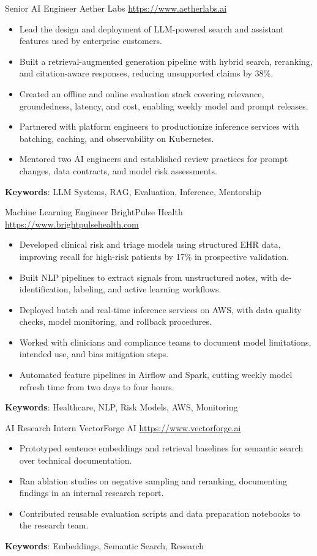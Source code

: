 \documentclass[a4paper, serif, 10pt]{moderncv}
\begin{document}
        {Senior AI Engineer}
        {Aether Labs}
        {\url{https://www.aetherlabs.ai}}
        {}
        {\begin{itemize}
\item Lead the design and deployment of LLM-powered search and assistant features used by enterprise customers.
\item Built a retrieval-augmented generation pipeline with hybrid search, reranking, and citation-aware responses, reducing unsupported claims by 38\%.
\item Created an offline and online evaluation stack covering relevance, groundedness, latency, and cost, enabling weekly model and prompt releases.
\item Partnered with platform engineers to productionize inference services with batching, caching, and observability on Kubernetes.
\item Mentored two AI engineers and established review practices for prompt changes, data contracts, and model risk assessments.
\end{itemize}
\textbf{Keywords}: LLM Systems, RAG, Evaluation, Inference, Mentorship}

        {Machine Learning Engineer}
        {BrightPulse Health}
        {\url{https://www.brightpulsehealth.com}}
        {}
        {\begin{itemize}
\item Developed clinical risk and triage models using structured EHR data, improving recall for high-risk patients by 17\% in prospective validation.
\item Built NLP pipelines to extract signals from unstructured notes, with de-identification, labeling, and active learning workflows.
\item Deployed batch and real-time inference services on AWS, with data quality checks, model monitoring, and rollback procedures.
\item Worked with clinicians and compliance teams to document model limitations, intended use, and bias mitigation steps.
\item Automated feature pipelines in Airflow and Spark, cutting weekly model refresh time from two days to four hours.
\end{itemize}
\textbf{Keywords}: Healthcare, NLP, Risk Models, AWS, Monitoring}

        {AI Research Intern}
        {VectorForge AI}
        {\url{https://www.vectorforge.ai}}
        {}
        {\begin{itemize}
\item Prototyped sentence embeddings and retrieval baselines for semantic search over technical documentation.
\item Ran ablation studies on negative sampling and reranking, documenting findings in an internal research report.
\item Contributed reusable evaluation scripts and data preparation notebooks to the research team.
\end{itemize}
\textbf{Keywords}: Embeddings, Semantic Search, Research}
\end{document}
